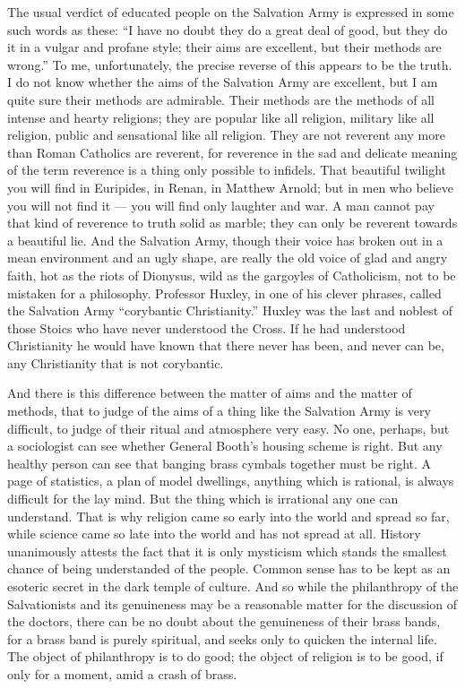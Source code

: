 The usual verdict of educated people on the Salvation Army is expressed in some such words as these: “I have no doubt they do a great deal of good, but they do it in a vulgar and profane style; their aims are excellent, but their methods are wrong.” To me, unfortunately, the precise reverse of this appears to be the truth. I do not know whether the aims of the Salvation Army are excellent, but I am quite sure their methods are admirable. Their methods are the methods of all intense and hearty religions; they are popular like all religion, military like all religion, public and sensational like all religion. They are not reverent any more than Roman Catholics are reverent, for reverence in the sad and delicate meaning of the term reverence is a thing only possible to infidels. That beautiful twilight you will find in Euripides, in Renan, in Matthew Arnold; but in men who believe you will not find it — you will find only laughter and war. A man cannot pay that kind of reverence to truth solid as marble; they can only be reverent towards a beautiful lie. And the Salvation Army, though their voice has broken out in a mean environment and an ugly shape, are really the old voice of glad and angry faith, hot as the riots of Dionysus, wild as the gargoyles of Catholicism, not to be mistaken for a philosophy. Professor Huxley, in one of his clever phrases, called the Salvation Army “corybantic Christianity.” Huxley was the last and noblest of those Stoics who have never understood the Cross. If he had understood Christianity he would have known that there never has been, and never can be, any Christianity that is not corybantic.

And there is this difference between the matter of aims and the matter of methods, that to judge of the aims of a thing like the Salvation Army is very difficult, to judge of their ritual and atmosphere very easy. No one, perhaps, but a sociologist can see whether General Booth’s housing scheme is right. But any healthy person can see that banging brass cymbals together must be right. A page of statistics, a plan of model dwellings, anything which is rational, is always difficult for the lay mind. But the thing which is irrational any one can understand. That is why religion came so early into the world and spread so far, while science came so late into the world and has not spread at all. History unanimously attests the fact that it is only mysticism which stands the smallest chance of being understanded of the people. Common sense has to be kept as an esoteric secret in the dark temple of culture. And so while the philanthropy of the Salvationists and its genuineness may be a reasonable matter for the discussion of the doctors, there can be no doubt about the genuineness of their brass bands, for a brass band is purely spiritual, and seeks only to quicken the internal life. The object of philanthropy is to do good; the object of religion is to be good, if only for a moment, amid a crash of brass.

